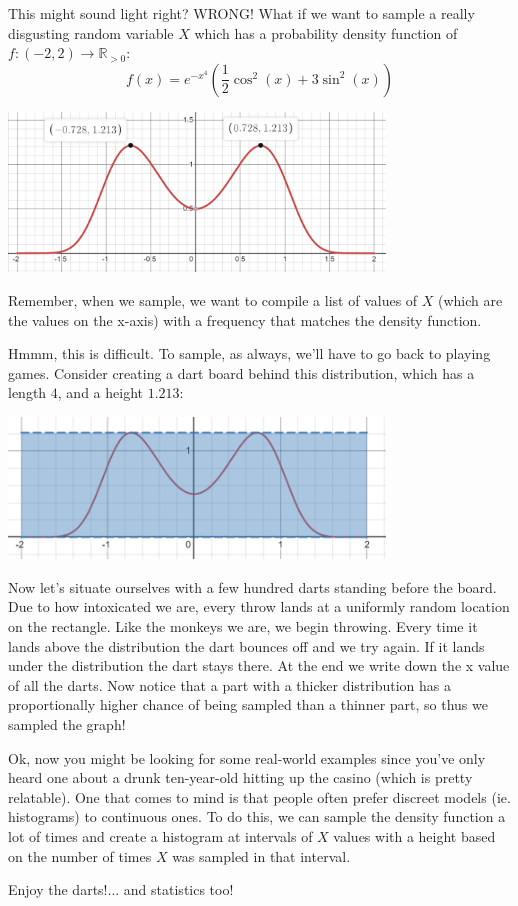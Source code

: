 \documentclass{article}
\begin{document}
This might sound light right? WRONG! What if we want to sample a really disgusting random variable $X$ which has a probability density function of $f:(-2,2)\rightarrow \mathbb{R}_{>0}$:
$$f(x)=e^{-x^4}\left(\frac{1}{2}\cos^2(x) + 3\sin^2(x)\right)$$
\begin{center}
    \includegraphics[width=10cm, scale=1.5]{dec23/images/ugly distribution.png}
\end{center}

Remember, when we sample, we want to compile a list of values of $X$ (which are the values on the x-axis) with a frequency that matches the density function.

Hmmm, this is difficult. To sample, as always, we'll have to go back to playing games. Consider creating a dart board behind this distribution, which has a length $4$, and a height $1.213$:
\begin{center}
    \includegraphics[width=10cm, scale=1.5]{dec23/images/ugly dartboard.png}
\end{center}

Now let's situate ourselves with a few hundred darts standing before the board. Due to how intoxicated we are, every throw lands at a uniformly random location on the rectangle. Like the monkeys we are, we begin throwing. Every time it lands above the distribution the dart bounces off and we try again. If it lands under the distribution the dart stays there. At the end we write down the x value of all the darts. Now notice that a part with a thicker distribution has a proportionally higher chance of being sampled than a thinner part, so thus we sampled the graph!

Ok, now you might be looking for some real-world examples since you've only heard one about a drunk ten-year-old hitting up the casino (which is pretty relatable). One that comes to mind is that people often prefer discreet models (ie. histograms) to continuous ones. To do this, we can sample the density function a lot of times and create a histogram at intervals of $X$ values with a height based on the number of times $X$ was sampled in that interval.

Enjoy the darts!... and statistics too!
\end{document}
